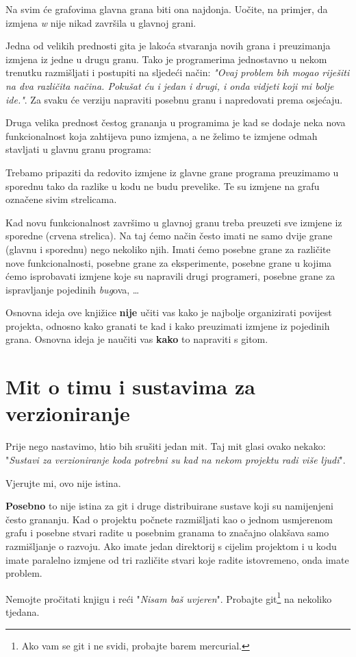 

Na svim će grafovima glavna grana biti ona najdonja.
Uočite, na primjer, da izmjena \emph w nije nikad završila u glavnoj grani. 

Jedna od velikih prednosti gita je lakoća stvaranja novih grana i preuzimanja izmjena iz jedne u drugu granu. 
Tako je programerima jednostavno u nekom trenutku razmišljati i postupiti na sljedeći način: \emph{"Ovaj problem bih mogao riješiti na dva različita načina. Pokušat ću i jedan i drugi, i onda vidjeti koji mi bolje ide."}. Za svaku će verziju napraviti posebnu granu i napredovati prema osjećaju.

Druga velika prednost čestog grananja u programima je kad se dodaje neka nova funkcionalnost koja zahtijeva puno izmjena, a ne želimo te izmjene odmah stavljati u glavnu granu programa:



Trebamo pripaziti da redovito izmjene iz glavne grane programa preuzimamo u sporednu tako da razlike u kodu ne budu prevelike. 
Te su izmjene na grafu označene sivim strelicama.

Kad novu funkcionalnost završimo u glavnoj granu treba preuzeti sve izmjene iz sporedne (crvena strelica). Na taj ćemo način često imati ne samo dvije grane (glavnu i sporednu) nego nekoliko njih.
Imati ćemo posebne grane za različite nove funkcionalnosti, posebne grane za eksperimente, posebne grane u kojima ćemo isprobavati izmjene koje su napravili drugi programeri, posebne grane za ispravljanje pojedinih \emph{bug}ova, \dots

Osnovna ideja ove knjižice \textbf{nije} učiti vas kako je najbolje organizirati povijest projekta, odnosno kako granati te kad i kako preuzimati izmjene iz pojedinih grana.
Osnovna ideja je naučiti vas \textbf{kako} to napraviti s gitom. 

\section*{Mit o timu i sustavima za verzioniranje}

Prije nego nastavimo, htio bih srušiti jedan mit. 
Taj mit glasi ovako nekako: "\emph{Sustavi za verzioniranje koda potrebni su kad na nekom projektu radi više ljudi}".

Vjerujte mi, ovo nije istina.

\textbf{Posebno} to nije istina za git i druge distribuirane sustave koji su namijenjeni često grananju.
Kad o projektu počnete razmišljati kao o jednom usmjerenom grafu i posebne stvari radite u posebnim granama to značajno olakšava samo razmišljanje o razvoju.
Ako imate jedan direktorij s cijelim projektom i u kodu imate paralelno izmjene od tri različite stvari koje radite istovremeno, onda imate problem.

Nemojte pročitati knjigu i reći "\emph{Nisam baš uvjeren}". 
Probajte git\footnote{Ako vam se git i ne svidi, probajte barem mercurial.} na nekoliko tjedana.

